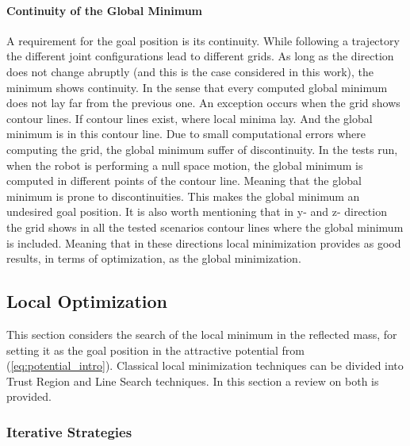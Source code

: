 \paragraph{Continuity of the Global Minimum}

A requirement for the goal position is its continuity. While following a trajectory the different joint configurations lead to different grids. As long as the direction does not change abruptly (and this is the case considered in this work), the minimum shows continuity. In the sense that every computed global minimum does not lay far from the previous one. An exception occurs when the grid shows contour lines. If contour lines exist, where local minima lay. And the global minimum is in this contour line. Due to small computational errors where computing the grid, the global minimum suffer of discontinuity. In the tests run, when the robot is performing a null space motion, the global minimum is computed in different points of the contour line. Meaning that the global minimum is prone to discontinuities. This makes the global minimum an undesired goal position.
It is also worth mentioning that in y- and z- direction the grid shows in all the tested scenarios contour lines where the global minimum is included. Meaning that in these directions local minimization provides as good results, in terms of optimization, as the global minimization. 




















\subsection{Local Optimization}
\label{ch:localoptimization}
\label{sec:localoptimization}


This section considers the search of the 
local minimum in the reflected mass, for setting it as the goal position in the attractive potential from (\ref{eq:potential_intro}). Classical local minimization techniques can be divided  into Trust Region and Line Search   techniques. In this section a review on both is provided.



\subsubsection{Iterative Strategies}
\label{sec:iterative_strategies}


